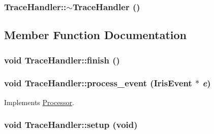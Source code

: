 \hypertarget{classTraceHandler_491147a0c061c2c3540e8e0e829602fe}{
\subsubsection[{$\sim$TraceHandler}]{\setlength{\rightskip}{0pt plus 5cm}TraceHandler::$\sim$TraceHandler ()}}
\label{classTraceHandler_491147a0c061c2c3540e8e0e829602fe}




\subsection{Member Function Documentation}
\hypertarget{classTraceHandler_0a0d8b0c9301bba86fc115cb6f3ebfc8}{
\subsubsection[{finish}]{\setlength{\rightskip}{0pt plus 5cm}void TraceHandler::finish ()}}
\label{classTraceHandler_0a0d8b0c9301bba86fc115cb6f3ebfc8}


\hypertarget{classTraceHandler_ce34c9fd6ca6893af23d1167348ee0c9}{
\subsubsection[{process\_\-event}]{\setlength{\rightskip}{0pt plus 5cm}void TraceHandler::process\_\-event ({\bf IrisEvent} $\ast$ {\em e})}}
\label{classTraceHandler_ce34c9fd6ca6893af23d1167348ee0c9}




Implements \hyperlink{classProcessor_18cdeefafbd8225cb3ad18dd098c0e08}{Processor}.\hypertarget{classTraceHandler_9311bd94c5ad0a6e354d2a0bd8b8699a}{
\subsubsection[{setup}]{\setlength{\rightskip}{0pt plus 5cm}void TraceHandler::setup (void)}}
\label{classTraceHandler_9311bd94c5ad0a6e354d2a0bd8b8699a}




